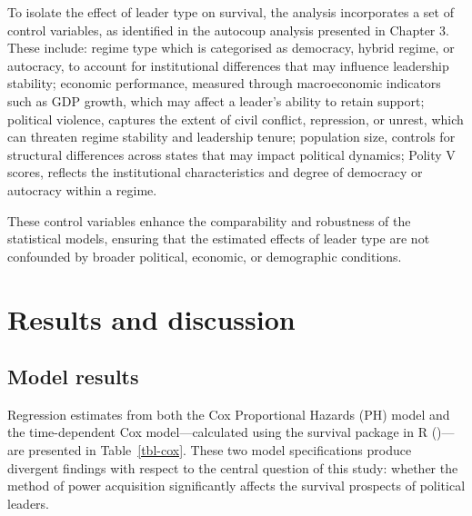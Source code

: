 \documentclass[
  12pt,
]{report}
\begin{document}
To isolate the effect of leader type on survival, the analysis
incorporates a set of control variables, as identified in the autocoup
analysis presented in Chapter 3. These include: regime type which is
categorised as democracy, hybrid regime, or autocracy, to account for
institutional differences that may influence leadership stability;
economic performance, measured through macroeconomic indicators such as
GDP growth, which may affect a leader's ability to retain support;
political violence, captures the extent of civil conflict, repression,
or unrest, which can threaten regime stability and leadership tenure;
population size, controls for structural differences across states that
may impact political dynamics; Polity V scores, reflects the
institutional characteristics and degree of democracy or autocracy
within a regime.

These control variables enhance the comparability and robustness of the
statistical models, ensuring that the estimated effects of leader type
are not confounded by broader political, economic, or demographic
conditions.

\section{Results and discussion}\label{results-and-discussion}

\subsection*{Model results}\label{model-results}

Regression estimates from both the Cox Proportional Hazards (PH) model
and the time-dependent Cox model---calculated using the survival package
in R ()---are presented in
Table~\ref{tbl-cox}. These two model specifications produce divergent
findings with respect to the central question of this study: whether the
method of power acquisition significantly affects the survival prospects
of political leaders.
\end{document}
